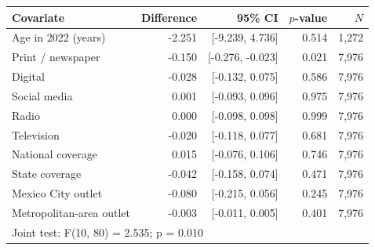 \begin{tabular}{lrrrr}
\toprule
Covariate & Difference & 95\% CI & $p$-value & $N$ \\
\midrule
Age in 2022 (years) & -2.251 & [-9.239, 4.736] & 0.514 & 1,272 \\
Print / newspaper & -0.150 & [-0.276, -0.023] & 0.021 & 7,976 \\
Digital & -0.028 & [-0.132, 0.075] & 0.586 & 7,976 \\
Social media & 0.001 & [-0.093, 0.096] & 0.975 & 7,976 \\
Radio & 0.000 & [-0.098, 0.098] & 0.999 & 7,976 \\
Television & -0.020 & [-0.118, 0.077] & 0.681 & 7,976 \\
National coverage & 0.015 & [-0.076, 0.106] & 0.746 & 7,976 \\
State coverage & -0.042 & [-0.158, 0.074] & 0.471 & 7,976 \\
Mexico City outlet & -0.080 & [-0.215, 0.056] & 0.245 & 7,976 \\
Metropolitan-area outlet & -0.003 & [-0.011, 0.005] & 0.401 & 7,976 \\
\midrule
\multicolumn{5}{l}{Joint test: F(10, 80) = 2.535; p = 0.010} \\
\bottomrule
\end{tabular}
